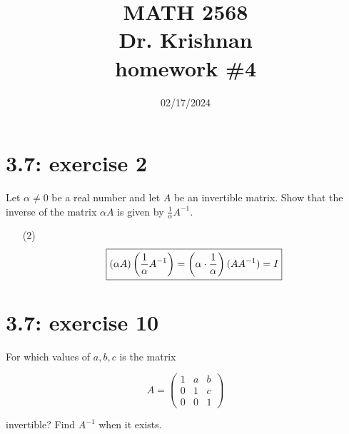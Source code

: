 \documentclass{report}
\title{\Huge{MATH 2568}\\\huge{Dr. Krishnan}\\homework \#4}
\author{\Huge{\mylink{https://www.sohumsuthar.com}{Sohum Suthar}}}
\date{\huge {02/17/2024}}
\begin{document}
\maketitle
\newpage
{}	
\tableofcontents
\pagebreak





\section*{3.7: exercise 2} 

Let $\alpha \neq 0$ be a real number and let $A$ be an invertible
matrix.  Show that the inverse of the matrix $\alpha A$ is given by
$\frac{1}{\alpha}A^{-1}$.




    


\sol

\begin{enumerate}
\item[(2)]
\begin{equation}
\begin{boxed}{
(\alpha A) \left( \frac{1}{\alpha} A^{-1} \right) = \left( \alpha \cdot \frac{1}{\alpha} \right) (AA^{-1}) = I}
\end{boxed}
\end{equation}
\end{enumerate}










\section*{3.7: exercise 10} 
 For which values of $a,b,c$ is the matrix

\[A = \begin{pmatrix}
1 & a & b \\
0 & 1 & c \\
0 & 0 & 1
\end{pmatrix}
\]

invertible? Find $A^{-1}$ when it exists.




\sol
\end{document}
